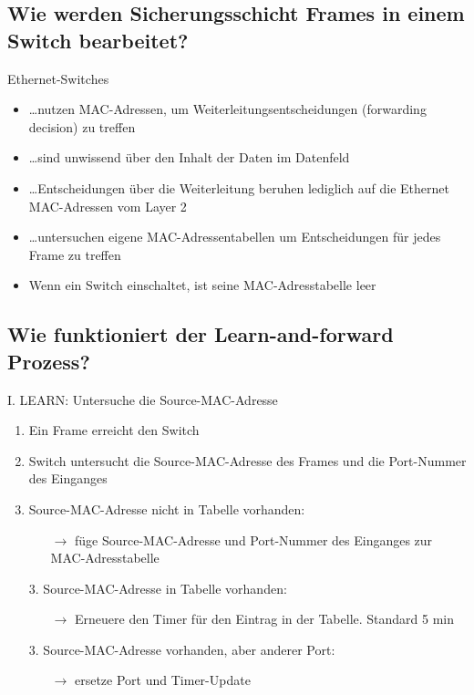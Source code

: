 \subsection*{Wie werden Sicherungsschicht Frames in einem Switch bearbeitet? }
Ethernet-Switches
\begin{itemize}
    \item \dots{}nutzen MAC-Adressen, um Weiterleitungsentscheidungen (forwarding decision) zu treffen
    \item \dots{}sind unwissend über den Inhalt der Daten im Datenfeld
    \item \dots{}Entscheidungen über die Weiterleitung beruhen lediglich auf die Ethernet MAC-Adressen vom Layer 2
    \item \dots{}untersuchen eigene MAC-Adressentabellen um Entscheidungen für jedes Frame zu treffen
    \item Wenn ein Switch einschaltet, ist seine MAC-Adresstabelle leer
\end{itemize}


\subsection*{Wie funktioniert der \flqq Learn-and-forward\frqq{} Prozess?}
I. LEARN: Untersuche die Source-MAC-Adresse
\begin{enumerate}
    \item Ein Frame erreicht den Switch
    \item Switch untersucht die Source-MAC-Adresse des Frames und die Port-Nummer des Einganges
    \item Source-MAC-Adresse nicht in Tabelle vorhanden:
    \begin{itemize}
        \item[$\rightarrow$] füge Source-MAC-Adresse und Port-Nummer des Einganges zur MAC-Adresstabelle
    \end{itemize}
    \item[3.] Source-MAC-Adresse in Tabelle vorhanden:
    \begin{itemize}
        \item[$\rightarrow$] Erneuere den Timer für den Eintrag in der Tabelle. Standard 5 min
    \end{itemize}
    \item[3.] Source-MAC-Adresse vorhanden, aber anderer Port:
    \begin{itemize}
        \item[$\rightarrow$] ersetze Port und Timer-Update
    \end{itemize}
\end{enumerate}\,\\[1em]

